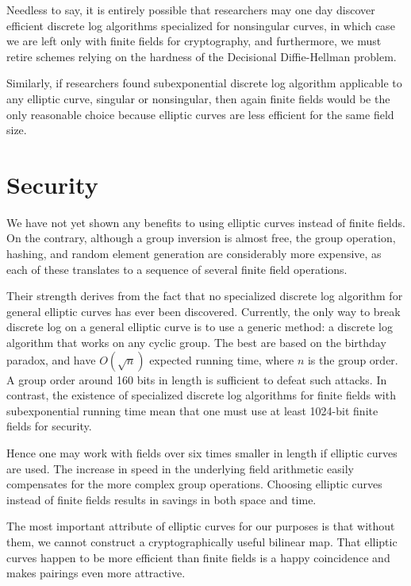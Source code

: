 Needless to say, it is entirely possible that researchers may one day discover
efficient discrete log algorithms specialized for nonsingular curves,
in which case we are left only with finite fields for cryptography, and
furthermore, we must retire schemes relying on the hardness of the Decisional
Diffie-Hellman problem.

Similarly, if researchers found subexponential discrete log algorithm
applicable to any elliptic curve, singular or nonsingular, then again finite
fields would be the only reasonable choice because elliptic curves are less
efficient for the same field size.

\section {\label{sec:eccsec}Security}

We have not yet shown any benefits to using elliptic curves instead of finite
fields. On the contrary, although a group inversion is almost free, the group
operation, hashing, and random element generation are considerably more
expensive, as each of these translates to a sequence of several finite field
operations.

Their strength derives from the fact that no specialized discrete log algorithm for general elliptic curves has ever been discovered. Currently, the only
way to break discrete log on a general elliptic curve is to use a generic
method: a discrete log algorithm that works on any cyclic group. The best are
based on the birthday paradox, and have $O(\sqrt{n})$ expected running time,
where $n$ is the group order. A group order around 160 bits in length is
sufficient to defeat such attacks. In contrast, the existence of specialized
discrete log algorithms for finite fields with subexponential running time mean
that one must use at least 1024-bit finite fields for security.

Hence one may work with fields over six times smaller in length if elliptic
curves are used. The increase in speed in the underlying field arithmetic
easily compensates for the more complex group operations. Choosing elliptic
curves instead of finite fields results in savings in both space and time.

The most important attribute of elliptic curves for our purposes is that
without them, we cannot construct a cryptographically useful bilinear map. That
elliptic curves happen to be more efficient than finite fields is a happy
coincidence and makes pairings even more attractive.

